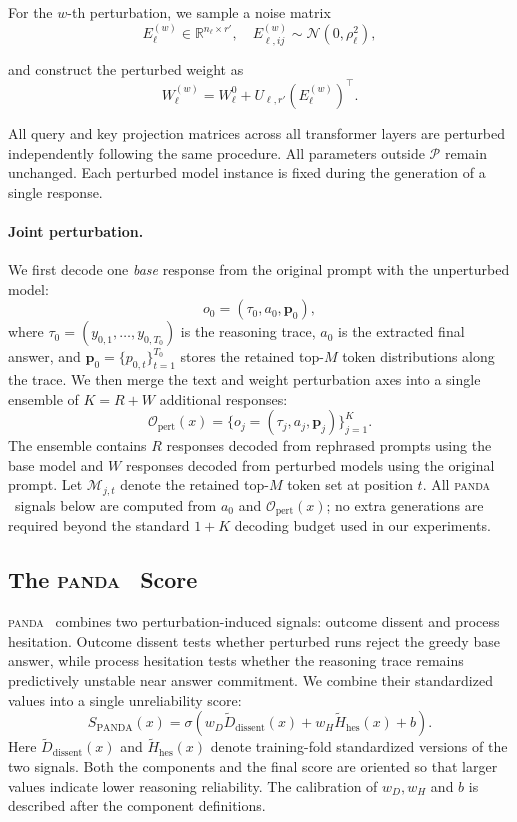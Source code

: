 \documentclass{article} %
\DeclareRobustCommand{\method}{%
  \texorpdfstring{%
    \ifmmode\text{\normalfont\textsc{panda}}\else\textsc{panda}\xspace\fi
  }{PANDA}%
}
\begin{document}
For the $w$-th perturbation, we sample a noise matrix
\[
E_{\ell}^{(w)} \in \mathbb{R}^{n_\ell \times r'}, \quad
E_{\ell,ij}^{(w)} \sim \mathcal{N}(0, \rho_\ell^2),
\]

and construct the perturbed weight as
\[
W_\ell^{(w)} = W_\ell^0 + U_{\ell,r'} (E_{\ell}^{(w)})^\top.
\]

All query and key projection matrices across all transformer layers are perturbed independently following the same procedure. All parameters outside $\mathcal{P}$ remain unchanged. Each perturbed model instance is fixed during the generation of a single response.

\paragraph{Joint perturbation.}
We first decode one \emph{base} response from the original prompt with the
unperturbed model:
\[
o_0=(\tau_0,a_0,\mathbf{p}_0),
\]
where $\tau_0=(y_{0,1},\ldots,y_{0,T_0})$ is the reasoning trace, $a_0$ is the
extracted final answer, and $\mathbf{p}_0=\{p_{0,t}\}_{t=1}^{T_0}$ stores the
retained top-$M$ token distributions along the trace.
We then merge the text and weight perturbation axes into a single ensemble of
$K=R+W$ additional responses:
\[
\mathcal{O}_{\mathrm{pert}}(x)
=
\{o_j=(\tau_j,a_j,\mathbf{p}_j)\}_{j=1}^{K}.
\]
The ensemble contains $R$ responses decoded from rephrased prompts using the
base model and $W$ responses decoded from perturbed models using the original
prompt.
Let $\mathcal{M}_{j,t}$ denote the retained top-$M$ token set at position $t$.
All \method\ signals below are computed from $a_0$ and
$\mathcal{O}_{\mathrm{pert}}(x)$; no extra generations are required beyond the
standard $1{+}K$ decoding budget used in our experiments.

\subsection{The \method\ Score}
\label{sec:panda-score}

\method\ combines two perturbation-induced signals: outcome dissent and process
hesitation.
Outcome dissent tests whether perturbed runs reject the greedy base answer,
while process hesitation tests whether the reasoning trace remains predictively
unstable near answer commitment.
We combine their standardized values into a single unreliability score:
\begin{equation}
\label{eq:panda}
S_{\mathrm{PANDA}}(x)
=
\sigma\!\left(
w_D \tilde{D}_{\mathrm{dissent}}(x)
+
w_H \tilde{H}_{\mathrm{hes}}(x)
+
b
\right).
\end{equation}
Here $\tilde{D}_{\mathrm{dissent}}(x)$ and
$\tilde{H}_{\mathrm{hes}}(x)$ denote training-fold standardized versions of the
two signals.
Both the components and the final score are oriented so that larger values
indicate lower reasoning reliability.
The calibration of $w_D,w_H$ and $b$ is described after the component
definitions.
\end{document}
